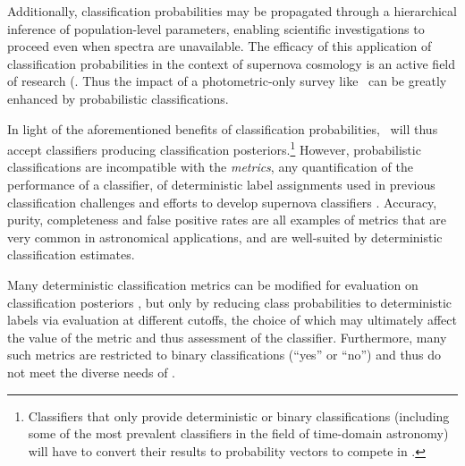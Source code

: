 Additionally, classification probabilities may be propagated through a hierarchical inference of population-level parameters, enabling scientific investigations to proceed even when spectra are unavailable.
The efficacy of this application of classification probabilities in the context of supernova cosmology is an active field of research (\citet{roberts_zbeams:_2017, scippr,2015ApJ...813..137R, 2018ApJ...857...51J}.
Thus the impact of a photometric-only survey like \lsst\ can be greatly enhanced by probabilistic classifications.

In light of the aforementioned benefits of classification probabilities, \plasticc\ will thus accept classifiers producing classification posteriors.\footnote{Classifiers that only provide deterministic or binary classifications (including some of the most prevalent classifiers in the field of time-domain astronomy) will have to convert their results to probability vectors to compete in \plasticc.}
However, probabilistic classifications are incompatible with the \textit{metrics}, any quantification of the performance of a classifier, of deterministic label assignments used in previous classification challenges \citep{kessler_supernova_2010, kessler_results_2010} and efforts to develop supernova classifiers \citep{narayan_machine_2018}.
Accuracy, purity, completeness and false positive rates are all examples of metrics that are very common in astronomical applications, and are well-suited by deterministic classification estimates.

Many deterministic classification metrics can be modified for evaluation on classification posteriors \citep{lochner_photometric_2016, moller_photometric_2016, hon_deep_2017, hon_detecting_2018, gieseke_detecting_2010}, but only by reducing class probabilities to deterministic labels via evaluation at different cutoffs, the choice of which may ultimately affect the value of the metric and thus assessment of the classifier.
Furthermore, many such metrics are restricted to binary classifications (``yes'' or ``no'') and thus do not meet the diverse needs of \plasticc.

